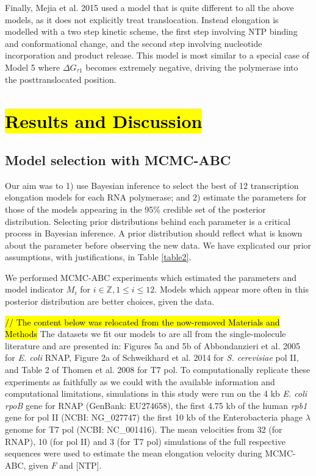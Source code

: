 \documentclass[10pt,letterpaper]{article}
\begin{document}
Finally, Mejia et al. 2015 \cite{mejia2015trigger} used a model that is quite different to all the above models, as it does not explicitly treat translocation. Instead elongation is modelled with a two step kinetic scheme, the first step involving NTP binding and conformational change, and the second step involving nucleotide incorporation and product release. This model is most similar to a special case of Model 5 where $\Delta G_{\tau 1}$ becomes extremely negative, driving the polymerase into the posttranslocated position.  






\section*{\hl{Results and Discussion}}





\subsection*{Model selection with MCMC-ABC}


Our aim was to 1) use Bayesian inference to select the best of 12 transcription elongation models for each RNA polymerase; and 2) estimate the parameters for those of the models appearing in the 95\% credible set of the posterior distribution. Selecting prior distributions behind each parameter is a  critical process in Bayesian inference. A prior distribution should reflect what is known about the parameter before observing the new data. We have explicated our prior assumptions, with justifications, in Table \ref{table2}. \par


We performed MCMC-ABC experiments which estimated the parameters and model indicator $M_i$ for $i \in \mathbb{Z}, 1 \leq i \leq 12$. Models which appear more often in this posterior distribution are better choices, given the data. \par  



\hl{// The content below was relocated from the now-removed Materials and Methods}
The datasets we fit our models to are all from the single-molecule literature and are presented in: Figures 5a and 5b of Abbondanzieri et al. 2005 \cite{abbondanzieri2005direct} for \textit{ E. coli} RNAP, Figure 2a of Schweikhard et al. 2014 \cite{schweikhard2014transcription} for \textit{ S. cerevisiae} pol II, and Table 2 of Thomen et al. 2008 \cite{thomen2008t7} for T7 pol. To computationally replicate these experiments as faithfully as we could with the available information and computational limitations, simulations in this study were run on the 4 kb \textit{E. coli} \textit{rpoB} gene for RNAP (GenBank: EU274658), the first 4.75 kb of the human \textit{ rpb1} gene for pol II (NCBI: NG\_027747) the first 10 kb of the Enterobacteria phage $\lambda$ genome for T7 pol (NCBI: NC\_001416). The mean velocities from 32 (for RNAP), 10 (for pol II) and 3 (for T7 pol) simulations of the full respective sequences were used to estimate the mean elongation velocity during MCMC-ABC, given $F$ and [NTP].  \par
\end{document}
